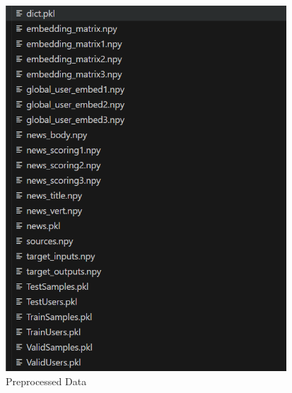 \documentclass[10pt,a4paper]{article}
\begin{document}
\begin{figure}[H]
  \centering
  \includegraphics[width=10.5cm]{fig/processed_data.png}
  \caption{Preprocessed Data}\label{fig:processed_data}
\end{figure}
\end{document}
